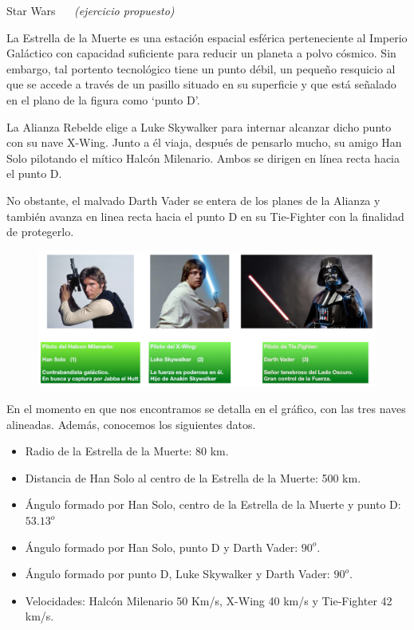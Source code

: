 \vspace{1cm}



\begin{myexampleblock}{Star Wars $\quad$ \emph{(ejercicio propuesto)} }
	
\vspace{2mm}La Estrella de la Muerte es una estación espacial esférica perteneciente al Imperio Galáctico con capacidad suficiente para reducir un planeta a polvo cósmico. Sin embargo, tal portento tecnológico tiene un punto débil, un pequeño resquicio al que se accede a través de un pasillo situado en su superficie y que está señalado en el plano de la figura como `punto D'.

\vspace{2mm}La Alianza Rebelde elige a Luke Skywalker para internar alcanzar dicho punto con su nave X-Wing. Junto a él viaja, después de pensarlo mucho, su amigo Han Solo pilotando el mítico Halcón Milenario. Ambos se dirigen en línea recta hacia el punto D.

\vspace{2mm}No obstante, el malvado Darth Vader se entera de los planes de la Alianza y también avanza en linea recta hacia el punto D en su Tie-Fighter con la finalidad de protegerlo.

\begin{figure}[H]
	\centering
	\includegraphics[width=.75\textwidth]{img-triang/sw5.png}
\end{figure}

En el momento en que nos encontramos se detalla en el gráfico, con las tres naves alineadas. Además, conocemos los siguientes datos.

\begin{itemize}
\item Radio de la Estrella de la Muerte: 80 km.
\item Distancia de Han Solo al centro de la Estrella de la Muerte: 500 km.
\item Ángulo formado por Han Solo, centro de la Estrella de la Muerte y punto D: $53.13^o$
\item Ángulo formado por Han Solo, punto D y Darth Vader: $90^o$.
\item Ángulo formado por punto D, Luke Skywalker y Darth Vader: $90^o$.
\item Velocidades: Halcón Milenario 50 Km/s, X-Wing 40 km/s y Tie-Fighter 42 km/s.
\end{itemize}


\end{myexampleblock}
